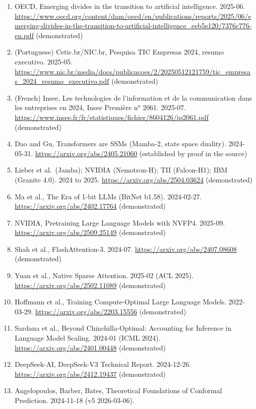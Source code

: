 \documentclass[10pt,letterpaper]{article}
\begin{document}
\begin{enumerate}
\item
  OECD, Emerging divides in the transition to artificial intelligence.
  2025-06.
  \url{https://www.oecd.org/content/dam/oecd/en/publications/reports/2025/06/emerging-divides-in-the-transition-to-artificial-intelligence_eeb5e120/7376c776-en.pdf}
  (demonstrated)
\item
  (Portuguese) Cetic.br/NIC.br, Pesquisa TIC Empresas 2024, resumo
  executivo. 2025-05.
  \url{https://www.nic.br/media/docs/publicacoes/2/20250512121759/tic_empresas_2024_resumo_executivo.pdf}
  (demonstrated)
\item
  (French) Insee, Les technologies de l'information et de la
  communication dans les entreprises en 2024, Insee Première n° 2061.
  2025-07.
  \url{https://www.insee.fr/fr/statistiques/fichier/8604126/ip2061.pdf}
  (demonstrated)
\item
  Dao and Gu, Transformers are SSMs (Mamba-2, state space duality).
  2024-05-31. \url{https://arxiv.org/abs/2405.21060} (established by
  proof in the source)
\item
  Lieber et al.~(Jamba); NVIDIA (Nemotron-H); TII (Falcon-H1); IBM
  (Granite 4.0). 2024 to 2025. \url{https://arxiv.org/abs/2504.03624}
  (demonstrated)
\item
  Ma et al., The Era of 1-bit LLMs (BitNet b1.58). 2024-02-27.
  \url{https://arxiv.org/abs/2402.17764} (demonstrated)
\item
  NVIDIA, Pretraining Large Language Models with NVFP4. 2025-09.
  \url{https://arxiv.org/abs/2509.25149} (demonstrated)
\item
  Shah et al., FlashAttention-3. 2024-07.
  \url{https://arxiv.org/abs/2407.08608} (demonstrated)
\item
  Yuan et al., Native Sparse Attention. 2025-02 (ACL 2025).
  \url{https://arxiv.org/abs/2502.11089} (demonstrated)
\item
  Hoffmann et al., Training Compute-Optimal Large Language Models.
  2022-03-29. \url{https://arxiv.org/abs/2203.15556} (demonstrated)
\item
  Sardana et al., Beyond Chinchilla-Optimal: Accounting for Inference in
  Language Model Scaling. 2024-01 (ICML 2024).
  \url{https://arxiv.org/abs/2401.00448} (demonstrated)
\item
  DeepSeek-AI, DeepSeek-V3 Technical Report. 2024-12-26.
  \url{https://arxiv.org/abs/2412.19437} (demonstrated)
\item
  Angelopoulos, Barber, Bates, Theoretical Foundations of Conformal
  Prediction. 2024-11-18 (v5 2026-03-06).

\end{enumerate}
\end{document}
